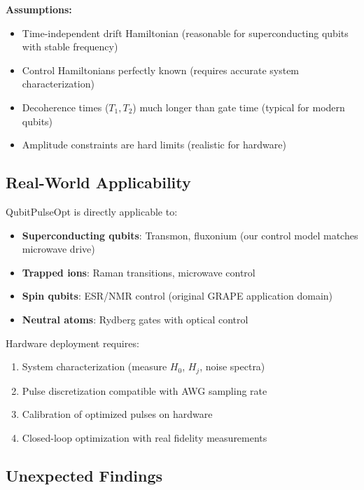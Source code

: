 \documentclass[11pt,a4paper]{article}
\theoremstyle{definition}
\theoremstyle{remark}
\begin{document}
\textbf{Assumptions:}

\begin{itemize}
    \item Time-independent drift Hamiltonian (reasonable for superconducting qubits with stable frequency)
    \item Control Hamiltonians perfectly known (requires accurate system characterization)
    \item Decoherence times ($T_1, T_2$) much longer than gate time (typical for modern qubits)
    \item Amplitude constraints are hard limits (realistic for hardware)
\end{itemize}

\subsection{Real-World Applicability}

QubitPulseOpt is directly applicable to:

\begin{itemize}
    \item \textbf{Superconducting qubits}: Transmon, fluxonium (our control model matches microwave drive)
    \item \textbf{Trapped ions}: Raman transitions, microwave control
    \item \textbf{Spin qubits}: ESR/NMR control (original GRAPE application domain)
    \item \textbf{Neutral atoms}: Rydberg gates with optical control
\end{itemize}

Hardware deployment requires:
\begin{enumerate}
    \item System characterization (measure $H_0$, $H_j$, noise spectra)
    \item Pulse discretization compatible with AWG sampling rate
    \item Calibration of optimized pulses on hardware
    \item Closed-loop optimization with real fidelity measurements
\end{enumerate}

\subsection{Unexpected Findings}
\end{document}
